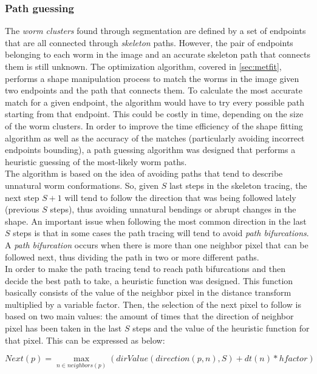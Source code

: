 \subsubsection*{Path guessing}
\label{sec:pathguessing}

The \emph{worm clusters} found through segmentation are defined by a set of endpoints
that are all connected through \emph{skeleton} paths. However, the pair of 
endpoints belonging to each worm in the image and an accurate skeleton 
path that
connects them is still unknown. The optimization algorithm, covered in \ref{sec:metfit},
performs a shape manipulation process to match the worms in the image given two endpoints
and the path that connects them. To calculate the most accurate match for a 
given endpoint, the algorithm would have to try every possible path starting
from that endpoint. This could be costly in time, depending on the size of
the worm clusters. In order to improve the time efficiency of the 
shape fitting algorithm as well as the accuracy of the matches 
(particularly avoiding incorrect endpoints bounding), 
a path guessing algorithm was designed that performs a heuristic
guessing of the most-likely worm paths.\\

The algorithm is based on the idea of avoiding paths that tend to describe 
unnatural worm conformations. So, given $S$ last steps in the skeleton tracing, 
the next step $S+1$ will tend to follow the direction that was being followed
lately (previous $S$ steps), 
thus avoiding unnatural bendings or abrupt changes in the shape. 
An important issue when following the most common direction in the 
last $S$ steps is that in some cases
the path tracing will tend to avoid \emph{path bifurcations}. 
A \emph{path bifurcation} occurs when there is more than one neighbor pixel that can be 
followed next, thus dividing the path in two or more different paths.\\

In order to make the path tracing tend to reach path bifurcations and then decide the best
path to take, a heuristic function was designed. This function basically 
consists of the value of the neighbor pixel
in the distance transform multiplied by a variable factor.
Then, the selection of the next pixel to follow is based on two main values:
the amount of times that the direction of neighbor pixel has been taken in the last $S$ steps and
the value of the heuristic function for that pixel. This can be expressed as below:

$$Next(p) = \max_{n \in neighbors(p)} (dirValue(direction(p,n),S) + dt(n)*hfactor)$$

